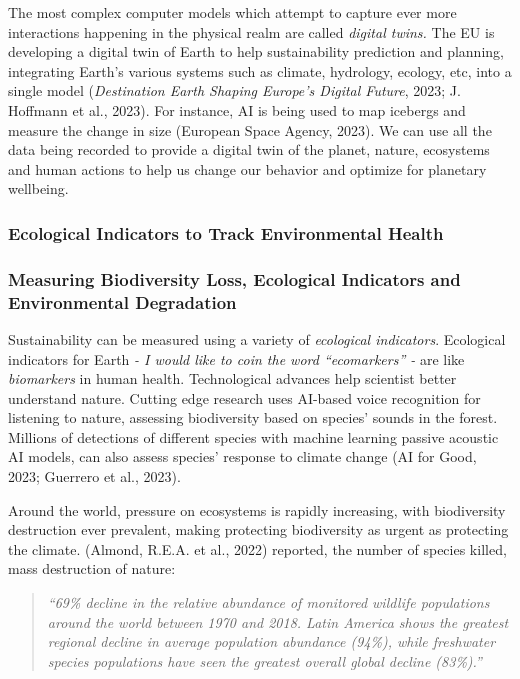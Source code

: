 \documentclass[
  12pt,
  letterpaper,
  DIV=11,
  numbers=noendperiod]{scrartcl}
\begin{document}
The most complex computer models which attempt to capture ever more
interactions happening in the physical realm are called \emph{digital
twins.} The EU is developing a digital twin of Earth to help
sustainability prediction and planning, integrating Earth's various
systems such as climate, hydrology, ecology, etc, into a single model
(\emph{Destination {Earth} {\textbar} {Shaping Europe}'s Digital
Future}, 2023; J. Hoffmann et al., 2023). For instance, AI is being used
to map icebergs and measure the change in size (European Space Agency,
2023). We can use all the data being recorded to provide a digital twin
of the planet, nature, ecosystems and human actions to help us change
our behavior and optimize for planetary wellbeing.

\subsubsection{Ecological Indicators to Track Environmental
Health}\label{ecological-indicators-to-track-environmental-health}

\subsubsection{Measuring Biodiversity Loss, Ecological Indicators and
Environmental
Degradation}\label{measuring-biodiversity-loss-ecological-indicators-and-environmental-degradation}

Sustainability can be measured using a variety of \emph{ecological
indicators}. Ecological indicators for Earth \emph{- I would like to
coin the word ``ecomarkers'' -} are like \emph{biomarkers} in human
health. Technological advances help scientist better understand nature.
Cutting edge research uses AI-based voice recognition for listening to
nature, assessing biodiversity based on species' sounds in the forest.
Millions of detections of different species with machine learning
passive acoustic AI models, can also assess species' response to climate
change (AI for Good, 2023; Guerrero et al., 2023).

Around the world, pressure on ecosystems is rapidly increasing, with
biodiversity destruction ever prevalent, making protecting biodiversity
as urgent as protecting the climate. (Almond, R.E.A. et al., 2022)
reported, the number of species killed, mass destruction of nature:

\begin{quote}
\emph{``69\% decline in the relative abundance of monitored wildlife
populations around the world between 1970 and 2018. Latin America shows
the greatest regional decline in average population abundance (94\%),
while freshwater species populations have seen the greatest overall
global decline (83\%).''}
\end{quote}
\end{document}
